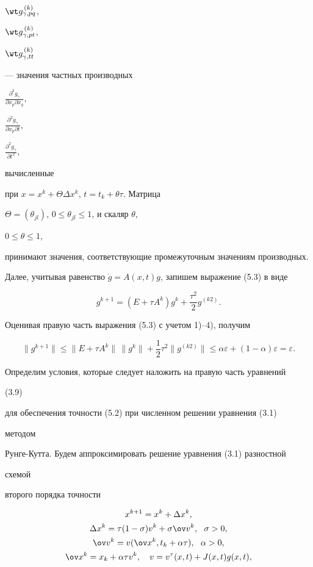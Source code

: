 $\wt g^{\,(k)}_{\gamma,p q}$, 


$\wt g^{\,(k)}_{\gamma,p t}$, 


$\wt g^{\,(k)}_{\gamma,t t}$ 


--- значения частных производных 


$\frac{\partial^2g_\gamma}{\partial x_p \partial x_q}$, 


$\frac{\partial^2g_\gamma}{\partial x_p \partial t}$, 


$\frac{\partial^2g_\gamma}{\partial t^2}$, 


вычисленные 


при $x=x^k+\Theta\Delta x^k$, $t=t_k+\theta\tau$. Матрица 


$\Theta=(\theta_{j l})$, $0\le\theta_{j l}\le1$, и скаляр $\theta$, 


$0\le\theta\le1$, 


принимают значения, соответствующие промежуточным значениям производных. 


 


Далее, учитывая равенство $\Dot g=A(x,t)g$, запишем выражение (5.3) в виде 


$$ 


g^{k+1}=(E+\tau A^k)g^k+\frac{\tau^2}{2}g^{(k2)}. 


$$ 


 


Оценивая правую часть выражения (5.3) с учетом 1)--4), получим 


$$ 


\|g^{k+1}\|\le\|E+\tau A^k\|\,\|g^k\|+\frac{1}{2}\tau^2 


\|g^{(k2)}\|\le\alpha\varepsilon+(1-\alpha) 


\varepsilon=\varepsilon. 


$$ 


 


Определим условия, которые следует наложить на правую часть уравнений 


(3.9) 


для обеспечения точности (5.2) при численном решении уравнения (3.1) 


методом 


Рун\-ге-Кут\-та. Будем аппроксимировать решение уравнения (3.1) разностной 


схемой 


второго порядка точности 


\begin{gather} 


x^{k+1}=x^k+\Delta x^k,\\ 


\Delta x^k=\tau(1-\sigma)v^k+\sigma\ov v^k,\ \ \sigma>0,\\ 


\ov v^k=v(\ov x^k,t_k+\alpha\tau),\ \ \alpha>0,\\ 


\ov x^k=x_k+\alpha\tau v^k,\quad 


v=v^\tau(x,t)+J(x,t)g(x,t), 


\end{gather} 


